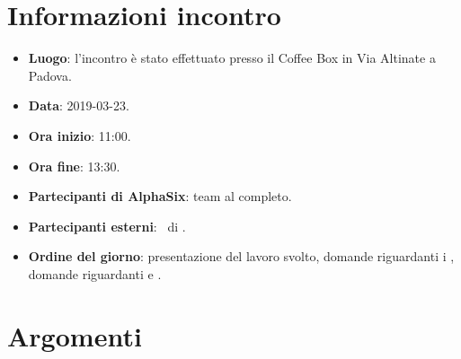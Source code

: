 \newcommand{\documento}{\VE}
\newcommand{\nomedocumentofisico}{VE\_2019-03-23.pdf}
\newcommand{\redazione}{\TG}
\newcommand{\verifica}{\CV}
\newcommand{\approvazione}{\NC}
\newcommand{\versione}{1.0.0}
\newcommand{\uso}{Esterno}
\newcommand{\destinateTo}{\TV, \\ & \RC, \\ & \II}
\newcommand{\datacreazione}{24 marzo 2019}
\newcommand{\datamodifica}{26 marzo 2019}
\newcommand{\stato}{Approvato}

\def\TABELLE{false}	%
\def\FIGURE{false} 	%






    

    

    \section{Informazioni incontro}
    	\begin{itemize}
    		\item \textbf{Luogo}: l'incontro è stato effettuato presso il Coffee Box in Via Altinate a Padova.
    		\item \textbf{Data}: 2019-03-23.
    		\item \textbf{Ora inizio}: 11:00.
    		\item \textbf{Ora fine}: 13:30.
    		\item \textbf{Partecipanti di AlphaSix}: team al completo.
    		\item \textbf{Partecipanti esterni}: \DZ~di \II.
    		\item \textbf{Ordine del giorno}: presentazione del lavoro svolto, domande riguardanti i , domande riguardanti
             e .

    	\end{itemize}

    \section{Argomenti}


